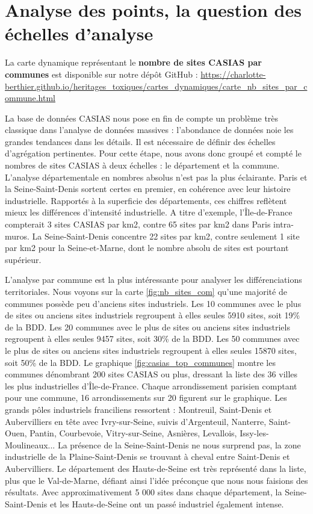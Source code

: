 \documentclass[a4paper,twoside,12pt]{book}
\begin{document}
\section{Analyse des points, la question des échelles d'analyse }
\begin{tcolorbox}[colback=gray!5!white,colframe=gray!20!white]
La carte dynamique représentant le \textbf{nombre de sites CASIAS par communes} est disponible sur notre dépôt GitHub : \url{https://charlotte-berthier.github.io/heritages_toxiques/cartes_dynamiques/carte_nb_sites_par_commune.html}
\end{tcolorbox}

La base de données CASIAS nous pose en fin de compte un problème très classique dans l'analyse de données massives : l'abondance de données noie les grandes tendances dans les détails. Il est nécessaire de définir des échelles d'agrégation pertinentes. Pour cette étape, nous avons donc groupé et compté le nombres de sites CASIAS à deux échelles : le département et la commune. L'analyse départementale en nombres absolus n'est pas la plus éclairante. Paris et la Seine-Saint-Denis sortent certes en premier, en cohérence avec leur histoire industrielle. Rapportés à la superficie des départements, ces chiffres reflètent mieux les différences d'intensité industrielle. A titre d'exemple, l'Île-de-France compterait 3 sites CASIAS par km2, contre 65 sites par km2 dans Paris intra-muros. La Seine-Saint-Denis concentre 22 sites par km2, contre seulement 1 site par km2 pour la Seine-et-Marne, dont le nombre absolu de sites est pourtant supérieur. 

L'analyse par commune est la plus intéressante pour analyser les différenciations territoriales. Nous voyons sur la carte \ref{fig:nb_sites_com} qu'une majorité de communes possède peu d'anciens sites industriels. Les 10 communes avec le plus de sites ou anciens sites industriels regroupent à elles seules 5910 sites, soit 19\% de la BDD. Les 20 communes avec le plus de sites ou anciens sites industriels regroupent à elles seules 9457 sites, soit 30\% de la BDD. Les 50 communes avec le plus de sites ou anciens sites industriels regroupent à elles seules 15870 sites, soit 50\% de la BDD. Le graphique \ref{fig:casias_top_communes} montre les communes dénombrant 200 sites CASIAS ou plus, dressant la liste des 36 villes les plus industrielles d'Île-de-France. Chaque arrondissement parisien comptant pour une commune, 16 arrondissements sur 20 figurent sur le graphique. Les grands pôles industriels franciliens ressortent : Montreuil, Saint-Denis et Aubervilliers en tête avec Ivry-sur-Seine, suivis d'Argenteuil, Nanterre, Saint-Ouen, Pantin, Courbevoie, Vitry-sur-Seine, Asnières, Levallois, Issy-les-Moulineaux... La présence de la Seine-Saint-Denis ne nous surprend pas, la zone industrielle de la Plaine-Saint-Denis se trouvant à cheval entre Saint-Denis et Aubervilliers. Le département des Hauts-de-Seine est très représenté dans la liste, plus que le Val-de-Marne, défiant ainsi l'idée préconçue que nous nous faisions des résultats. Avec approximativement 5 000 sites dans chaque département, la Seine-Saint-Denis et les Hauts-de-Seine ont un passé industriel également intense. 
\end{document}
